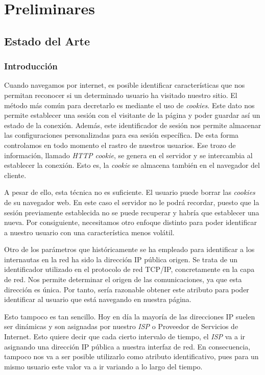 \chapter{Preliminares}
\section{Estado del Arte}
\subsection{Introducción}
Cuando navegamos por internet, es posible identificar características que nos permitan reconocer si un determinado usuario ha visitado nuestro sitio. El método más común para decretarlo es mediante el uso de \textit{cookies}. Este dato nos permite establecer una sesión con el visitante de la página y poder guardar así un estado de la conexión. Además, este identificador de sesión nos permite almacenar las configuraciones personalizadas para esa sesión específica. De esta forma controlamos en todo momento el rastro de nuestros usuarios. Ese trozo de información, llamado \textit{HTTP cookie}\cite{rfc6265}, se genera en el servidor y se intercambia al establecer la conexión. Esto es, la \textit{cookie} se almacena también en el navegador del cliente. \par

A pesar de ello, esta técnica no es suficiente. El usuario puede borrar las \textit{cookies} de su navegador web. En este caso el servidor no le podrá recordar, puesto que la sesión previamente establecida no se puede recuperar y habría que establecer una nueva. Por consiguiente, necesitamos otro enfoque distinto para poder identificar a nuestro usuario con una característica menos volátil. \par

Otro de los parámetros que históricamente se ha empleado para identificar a los internautas en la red ha sido la dirección IP pública origen. Se trata de un identificador utilizado en el protocolo de red TCP/IP, concretamente en la capa de red. Nos permite determinar el origen de las comunicaciones, ya que esta dirección es única. Por tanto, sería razonable obtener este atributo para poder identificar al usuario que está navegando en nuestra página. \par

Esto tampoco es tan sencillo. Hoy en día la mayoría de las direcciones IP suelen ser dinámicas y son asignadas por nuestro \textit{ISP} o Proveedor de Servicios de Internet. Esto quiere decir que cada cierto intervalo de tiempo, el \textit{ISP} va a ir asignando una dirección IP pública a nuestra interfaz de red. En consecuencia, tampoco nos va a ser posible utilizarlo como atributo identificativo, pues para un mismo usuario este valor va a ir variando a lo largo del tiempo. \par

